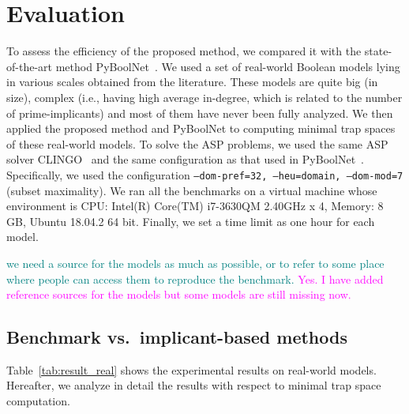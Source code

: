 \documentclass[runningheads]{llncs}
\newcommand{\vangiang}[1]{\textcolor{magenta}{#1}}
\newcommand{\sylvain}[1]{\textcolor{teal}{#1}}
\begin{document}
\section{Evaluation}
To assess the efficiency of the proposed method, we compared it with the state-of-the-art method PyBoolNet~\cite{klarner2017pyboolnet}.
We used a set of real-world Boolean models lying in various scales obtained from the literature.
These models are quite big (in size), complex (i.e., having high average in-degree, which is related to the number of prime-implicants) and most of them have never been fully analyzed.
We then applied the proposed method and PyBoolNet to computing minimal trap spaces of these real-world models.
To solve the ASP problems, we used the same ASP solver CLINGO~\cite{DBLP:journals/aicom/GebserKKOSS11} and the same configuration as that used in PyBoolNet~\cite{klarner2015computing}.
Specifically, we used the configuration \texttt{--dom-pref=32, --heu=domain, --dom-mod=7} (subset maximality). We ran all the benchmarks on a virtual machine whose environment is CPU: Intel(R) Core(TM) i7-3630QM 2.40GHz x 4, Memory: 8 GB, Ubuntu 18.04.2 64 bit. Finally, we set a time limit as one hour for each model.

\sylvain{we need a source for the models as much as possible, or to refer to some place where people can access them to reproduce the benchmark.}
\vangiang{Yes. I have added reference sources for the models but some models are still missing now.}

\subsection{Benchmark vs.\ implicant-based methods}

Table~\ref{tab:result_real} shows the experimental results on real-world models. Hereafter, we analyze in detail the results with respect to minimal trap space computation.
\end{document}
